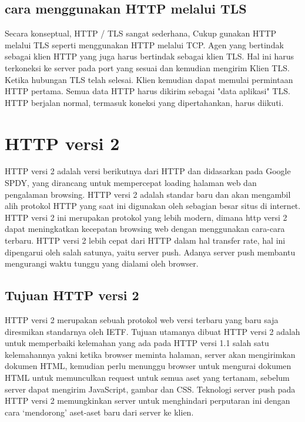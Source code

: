 \subsection{cara menggunakan HTTP melalui TLS}
Secara konseptual, HTTP / TLS sangat sederhana, Cukup gunakan HTTP melalui TLS seperti menggunakan HTTP melalui TCP. Agen yang bertindak sebagai klien HTTP yang juga harus bertindak sebagai klien TLS. Hal ini harus terkoneksi ke server pada port yang sesuai dan kemudian mengirim Klien TLS. Ketika hubungan TLS telah selesai. Klien kemudian dapat memulai permintaan HTTP pertama. Semua data HTTP harus dikirim sebagai "data aplikasi" TLS. HTTP berjalan normal, termasuk koneksi yang dipertahankan, harus diikuti\cite{rescorla2000http}.

\section{HTTP versi 2}
HTTP versi 2 adalah versi berikutnya dari HTTP dan didasarkan pada Google SPDY, yang dirancang untuk mempercepat loading halaman web dan pengalaman browsing. HTTP versi 2 adalah standar baru dan akan mengambil alih protokol HTTP yang saat ini digunakan oleh sebagian besar situs di internet. HTTP versi 2 ini merupakan protokol yang lebih modern, dimana http versi 2 dapat meningkatkan kecepatan browsing web dengan menggunakan cara-cara terbaru. HTTP versi 2 lebih cepat dari HTTP dalam hal transfer rate, hal ini dipengarui oleh salah satunya, yaitu server push. Adanya server push membantu mengurangi waktu tunggu yang dialami oleh browser\cite{engku2016analisis}.

\subsection{Tujuan HTTP versi 2}
HTTP versi 2 merupakan sebuah protokol web versi terbaru yang baru saja diresmikan standarnya oleh IETF. Tujuan utamanya dibuat HTTP versi 2 adalah untuk memperbaiki kelemahan yang ada pada HTTP versi 1.1 salah satu kelemahannya yakni ketika browser meminta halaman, server akan mengirimkan dokumen HTML, kemudian perlu menunggu browser untuk mengurai dokumen HTML untuk memunculkan request untuk semua aset yang tertanam, sebelum server dapat mengirim JavaScript, gambar dan CSS. Teknologi server push pada HTTP versi 2 memungkinkan server untuk menghindari perputaran ini dengan cara `mendorong' aset-aset baru dari server ke klien\cite{engku2016analisis}.

